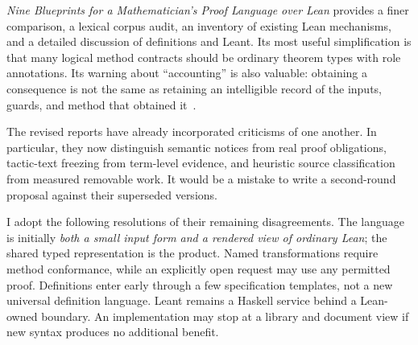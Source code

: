 \documentclass[11pt,a4paper]{article}
\newcommand{\code}[1]{\texttt{\detokenize{#1}}}
\theoremstyle{remark}\newtheorem{example}[proposition]{Example}
\begin{document}
\emph{Nine Blueprints for a Mathematician's Proof Language over Lean} provides a finer comparison, a lexical corpus audit, an inventory of existing Lean mechanisms, and a detailed discussion of definitions and Leant. Its most useful simplification is that many logical method contracts should be ordinary theorem types with role annotations. Its warning about ``accounting'' is also valuable: obtaining a consequence is not the same as retaining an intelligible record of the inputs, guards, and method that obtained it~\cite{blueprints}.

The revised reports have already incorporated criticisms of one another. In particular, they now distinguish semantic notices from real proof obligations, tactic-text freezing from term-level evidence, and heuristic source classification from measured removable work. It would be a mistake to write a second-round proposal against their superseded versions.

I adopt the following resolutions of their remaining disagreements. The language is initially \emph{both a small input form and a rendered view of ordinary Lean}; the shared typed representation is the product. Named transformations require method conformance, while an explicitly open \code{prove} request may use any permitted proof. Definitions enter early through a few specification templates, not a new universal definition language. Leant remains a Haskell service behind a Lean-owned boundary. An implementation may stop at a library and document view if new syntax produces no additional benefit.
\end{document}

